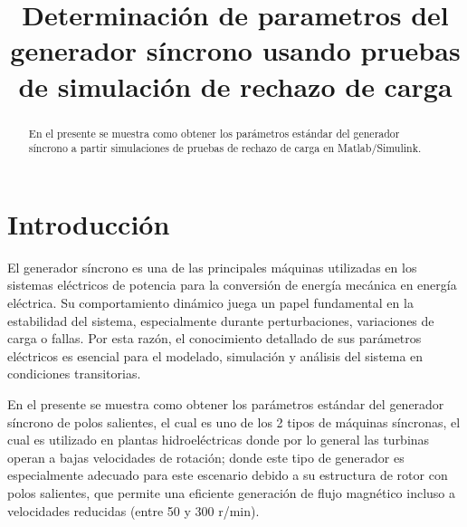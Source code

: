 \documentclass[conference]{IEEEtran}
\begin{document}
\title{Determinación de parametros del generador síncrono usando pruebas de simulación de rechazo de carga}


\author{
}


\maketitle

\thispagestyle{firststyle}
\renewcommand{\headrulewidth}{0in}
\pagestyle{empty}

\pagestyle{fancy}
\chead{\fontsize{8}{10} \selectfont \textit{} }

\begin{abstract}
	En el presente se muestra como obtener los parámetros estándar del generador síncrono a partir simulaciones de pruebas de rechazo de carga en Matlab/Simulink.
\end{abstract}

\section{Introducción}
El generador síncrono es una de las principales máquinas utilizadas en los sistemas eléctricos de potencia para la conversión de energía mecánica en energía eléctrica. Su comportamiento dinámico juega un papel fundamental en la estabilidad del sistema, especialmente durante perturbaciones, variaciones de carga o fallas. Por esta razón, el conocimiento detallado de sus parámetros eléctricos es esencial para el modelado, simulación y análisis del sistema en condiciones transitorias.

En el presente se muestra como obtener los parámetros estándar del generador síncrono de polos salientes, el cual es uno de los 2 tipos de máquinas síncronas, el cual es utilizado en plantas hidroeléctricas donde por lo general las turbinas operan a bajas velocidades de rotación; donde este tipo de generador es especialmente adecuado para este escenario debido a su estructura de rotor con polos salientes, que permite una eficiente generación de flujo magnético incluso a velocidades reducidas (entre 50 y 300 r/min).
\end{document}
